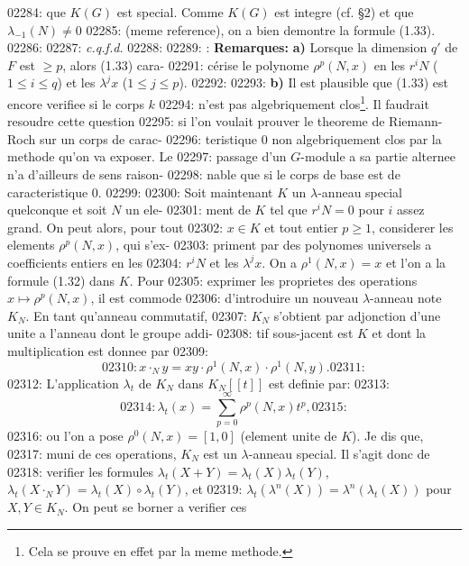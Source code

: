 02284: que $K(G)$ est special. Comme $K(G)$ est integre (cf. \S 2) et que $\lambda_{-1}(N) \neq 0$
02285: (meme reference), on a bien demontre la formule (1.33).
02286: 
02287: \hfill \textit{c.q.f.d.}
02288: 
02289: : \textbf{Remarques:} \textbf{a)} Lorsque la dimension $q'$ de $F$ est $\geq p$, alors (1.33) cara-
02291: c\'erise le polynome $\rho^p(N, x)$ en les $r^i N$ ($1 \leq i \leq q$) et les $\lambda^j x$ ($1 \leq j \leq p$).
02292: 
02293: \textbf{b)} Il est plausible que (1.33) est encore verifiee si le corps $k$
02294: n'est pas algebriquement clos\footnote{Cela se prouve en effet par la meme methode.}. Il faudrait resoudre cette question
02295: si l'on voulait prouver le theoreme de Riemann-Roch sur un corps de carac-
02296: teristique 0 non algebriquement clos par la methode qu'on va exposer. Le
02297: passage d'un $G$-module a sa partie alternee n'a d'ailleurs de sens raison-
02298: nable que si le corps de base est de caracteristique 0.
02299: 
02300: Soit maintenant $K$ un $\lambda$-anneau special quelconque et soit $N$ un ele-
02301: ment de $K$ tel que $r^i N = 0$ pour $i$ assez grand. On peut alors, pour tout
02302: $x \in K$ et tout entier $p \geq 1$, considerer les elements $\rho^p(N, x)$, qui s'ex-
02303: priment par des polynomes universels a coefficients entiers en les
02304: $r^i N$ et les $\lambda^j x$. On a $\rho^1(N, x) = x$ et l'on a la formule (1.32) dans $K$. Pour
02305: exprimer les proprietes des operations $x \mapsto \rho^p(N, x)$, il est commode
02306: d'introduire un nouveau $\lambda$-anneau note $K_N$. En tant qu'anneau commutatif,
02307: $K_N$ s'obtient par adjonction d'une unite a l'anneau dont le groupe addi-
02308: tif sous-jacent est $K$ et dont la multiplication est donnee par
02309: \begin{equation}
02310: x \cdot_N y = xy \cdot \rho^1(N, x) \cdot \rho^1(N, y).
02311: \end{equation}
02312: L'application $\lambda_t$ de $K_N$ dans $K_N[[t]]$ est definie par:
02313: \begin{equation}
02314: \lambda_t(x) = \sum_{p=0}^{\infty} \rho^p(N, x) t^p,
02315: \end{equation}
02316: ou l'on a pose $\rho^0(N, x) = [1, 0]$ (element unite de $K$). Je dis que,
02317: muni de ces operations, $K_N$ est un $\lambda$-anneau special. Il s'agit donc de
02318: verifier les formules $\lambda_t(X+Y) = \lambda_t(X) \lambda_t(Y)$, $\lambda_t(X \cdot_N Y) = \lambda_t(X) \circ \lambda_t(Y)$, et
02319: $\lambda_t(\lambda^n(X)) = \lambda^n(\lambda_t(X))$ pour $X, Y \in K_N$. On peut se borner a verifier ces
